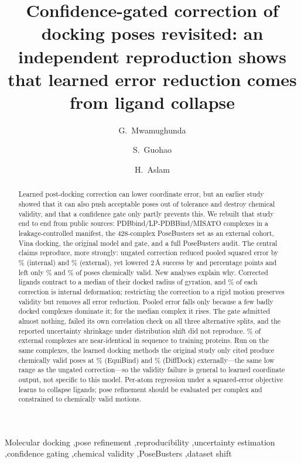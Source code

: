 \documentclass[preprint,12pt,authoryear]{elsarticle}
\newcommand{\Ang}{\,\AA}
\begin{document}
\begin{frontmatter}

\title{Confidence-gated correction of docking poses revisited: an independent reproduction shows that learned error reduction comes from ligand collapse}

\author[dhu]{G.~Mwamughunda}
\author[dhu]{S.~Guohao}
\author[dhu]{H.~Aslam}

\begin{abstract}
Learned post-docking correction can lower coordinate error, but an earlier study showed that it can also push acceptable poses
out of tolerance and destroy chemical validity, and that a confidence gate only partly prevents this. We rebuilt that study
end to end from public sources: \IntersectN{} PDBbind/LP-PDBBind/MISATO complexes in a leakage-controlled manifest, the
428-complex PoseBusters set as an external cohort, Vina docking, the original model and gate, and a full
PoseBusters audit. The central claims reproduce, more strongly: ungated correction reduced pooled
squared error by \MSEInt\% (internal) and \MSEExt\% (external), yet lowered 2\Ang{} success by \NetUngInt{} and \NetUngExt{}
percentage points and left only \PassUngInt\% and \PassUngExt\% of poses chemically valid. New analyses explain why.
Corrected ligands contract to a median \RgCorrInt{} of their docked radius of gyration, and \InternalShareInt\% of each
correction is internal deformation; restricting the correction to a rigid motion preserves validity but removes all error
reduction. Pooled error falls only because a few badly docked complexes dominate it; for the median complex it rises. The gate
admitted almost nothing, failed its own correlation check on all three alternative splits, and the reported uncertainty
shrinkage under distribution shift did not reproduce. \SeqNearPct\% of external complexes are near-identical in sequence to
training proteins. Run on the same complexes, the learned docking methods the original study only cited produce chemically
valid poses at \EqBPassExt\% (EquiBind) and \DDPassExt\% (DiffDock) externally---the same low range as the ungated
correction---so the validity failure is general to learned coordinate output, not specific to this model. Per-atom regression
under a squared-error objective learns to collapse ligands; pose refinement should be evaluated per complex and constrained to
chemically valid motions.
\end{abstract}

\begin{keyword}
Molecular docking \sep pose refinement \sep reproducibility \sep uncertainty estimation \sep confidence gating \sep chemical validity \sep PoseBusters \sep dataset shift
\end{keyword}
\end{frontmatter}
\end{document}
